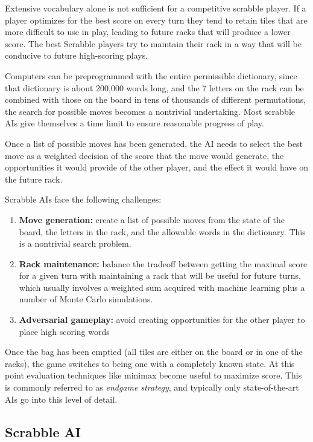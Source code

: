 \documentclass[12pt]{article}
\begin{document}
Extensive vocabulary alone is not sufficient for a competitive
scrabble player. If a player optimizes for the best score on every
turn they tend to retain tiles that are more difficult to use in play,
leading to future racks that will produce a lower score. The best
Scrabble players try to maintain their rack in a way that will be
conducive to future high-scoring plays.

Computers can be preprogrammed with the entire permissible dictionary,
since that dictionary is about 200,000 words long, and the 7 letters
on the rack can be combined with those on the board in tens of
thousands of different permutations, the search for possible moves
becomes a nontrivial undertaking. Most scrabble AIs give themselves a
time limit to ensure reasonable progress of play.

Once a list of possible moves has been generated, the AI needs to
select the best move as a weighted decision of the score that the move
would generate, the opportunities it would provide of the other
player, and the effect it would have on the future rack.

Scrabble AIs face the following challenges:
\begin{enumerate}
  \item \textbf{Move generation:} create a list of possible moves from
    the state of the board, the letters in the rack, and the allowable
    words in the dictionary. This is a nontrivial search problem.
    
  \item \textbf{Rack maintenance:} balance the tradeoff between getting
    the maximal score for a given turn with maintaining a rack that
    will be useful for future turns, which usually involves a weighted
    sum acquired with machine learning plus a number of Monte Carlo
    simulations.
    
  \item \textbf{Adversarial gameplay:} avoid creating opportunities
    for the other player to place high scoring words 
\end{enumerate}

Once the bag has been emptied (all tiles are either on the board or in
one of the racks), the game switches to being one with a completely
known state. At this point evaluation techniques like minimax become
useful to maximize score. This is commonly referred to as
\emph{endgame strategy}, and typically only state-of-the-art AIs go
into this level of detail.

\subsection*{Scrabble AI}
\end{document}
